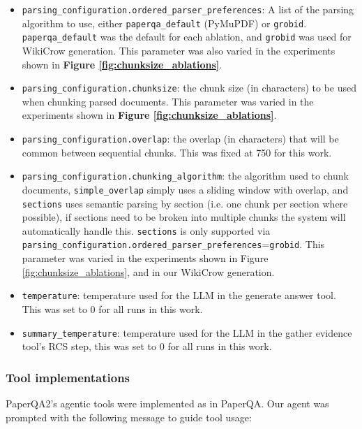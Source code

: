 \documentclass{article}
\begin{document}
\begin{itemize}
\item \texttt{parsing\_configuration.ordered\_parser\_preferences}: A list of the parsing algorithm to use, either \texttt{paperqa\_default} (PyMuPDF) or \texttt{grobid}. \texttt{paperqa\_default} was the default for each ablation, and \texttt{grobid} was used for WikiCrow generation. This parameter was also varied in the experiments shown in \textbf{Figure \ref{fig:chunksize_ablations}}. 
\item \texttt{parsing\_configuration.chunksize}: the chunk size (in characters) to be used when chunking parsed documents. This parameter was varied in the experiments shown in \textbf{Figure \ref{fig:chunksize_ablations}}.
\item \texttt{parsing\_configuration.overlap}: the overlap (in characters) that will be common between sequential chunks. This was fixed at 750 for this work. 
\item \texttt{parsing\_configuration.chunking\_algorithm}: the algorithm used to chunk documents, \texttt{simple\_overlap} simply uses a sliding window with overlap, and \texttt{sections} uses semantic parsing by section (i.e. one chunk per section where possible), if sections need to be broken into multiple chunks the system will automatically handle this. \texttt{sections} is only supported via \texttt{parsing\_configuration.ordered\_parser\_preferences}=\texttt{grobid}. This parameter was varied in the experiments shown in {Figure \ref{fig:chunksize_ablations}}, and in our WikiCrow generation.
\item \texttt{temperature}: temperature used for the LLM in the generate answer tool.  This was set to 0 for all runs in this work.
\item \texttt{summary\_temperature}: temperature used for the LLM in the gather evidence tool's RCS step, this was set to 0 for all runs in this work.
\end{itemize}

\subsubsection{Tool implementations} \label{sec:cit-trav}

PaperQA2's agentic tools were implemented as in PaperQA\cite{lala2023paperqa}. Our agent was prompted with the following message to guide tool usage: 
\end{document}
